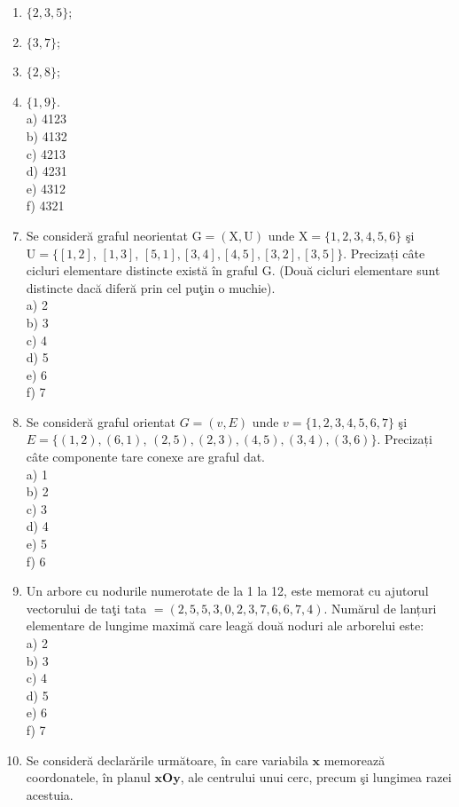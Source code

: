 \begin{enumerate}
  \item $\{2,3,5\}$;
  \item $\{3,7\}$;
  \item $\{2,8\}$;
  \item $\{1,9\}$.\\
a) 4123\\
b) 4132\\
c) 4213\\
d) 4231\\
e) 4312\\
f) 4321
\end{enumerate}

\begin{enumerate}
  \setcounter{enumi}{6}
  \item Se consideră graful neorientat $\mathrm{G}=(\mathrm{X}, \mathrm{U})$ unde $\mathrm{X}=\{1,2,3,4,5,6\}$ şi $\mathrm{U}=\{[1,2]$, $[1,3]$, $[5,1],[3,4],[4,5],[3,2],[3,5]\}$. Precizați câte cicluri elementare distincte există în graful G. (Două cicluri elementare sunt distincte dacă diferă prin cel puţin o muchie).\\
a) 2\\
b) 3\\
c) 4\\
d) 5\\
e) 6\\
f) 7
  \item Se consideră graful orientat $G=(v, E)$ unde $v=\{1,2,3,4,5,6,7\}$ şi $E=\{(1,2),(6,1)$, $(2,5),(2,3),(4,5),(3,4),(3,6)\}$. Precizați câte componente tare conexe are graful dat.\\
a) 1\\
b) 2\\
c) 3\\
d) 4\\
e) 5\\
f) 6
  \item Un arbore cu nodurile numerotate de la 1 la 12, este memorat cu ajutorul vectorului de taţi tata $=(2,5,5,3,0,2,3,7,6,6,7,4)$. Numărul de lanțuri elementare de lungime maximă care leagă două noduri ale arborelui este:\\
a) 2\\
b) 3\\
c) 4\\
d) 5\\
e) 6\\
f) 7
  \item Se consideră declarările următoare, în care variabila $\mathbf{x}$ memorează coordonatele, în planul $\mathbf{x O y}$, ale centrului unui cerc, precum şi lungimea razei acestuia.
\end{enumerate}

